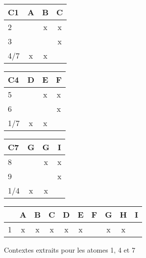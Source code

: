 \begin{figure}[H]
	\begin{minipage}[c]{0.3\textwidth}
	\begin{center}
		\begin{minipage}[c]{1\textwidth}
		\begin{center}
			\begin{tabular}{ l | c c c }
				C1 & A & B & C \\
				\hline
				2 & & x & x \\
				3 & & & x \\
				4/7 & x & x & \\
			\end{tabular}
		\end{center}
		\end{minipage}
		\begin{minipage}[c]{1\textwidth}
		\begin{center}
			\begin{tabular}{ l | c c c }
				C4 & D & E & F \\
				\hline
				5 & & x & x \\
				6 & & & x \\
				1/7 & x & x & \\
			\end{tabular}
		\end{center}
		\end{minipage}
		\begin{minipage}[c]{1\textwidth}
		\begin{center}
			\begin{tabular}{ l | c c c }
				C7 & G & G & I \\
				\hline
				8 & & x & x \\
				9 & & & x \\
				1/4 & x & x & \\
			\end{tabular}
		\end{center}
		\end{minipage}
	\end{center}
	\caption{Contextes extraits pour les atomes 1, 4 et 7}
	\label{contextes_extraits}
	\end{minipage}
	\begin{minipage}[c]{0.7\textwidth}
	\begin{center}
		\begin{tabular}{ l | c c c c c c c c c }
			& A & B & C & D & E & F & G & H & I \\
			\hline
			1 & x & x & x & x & x & & x & x & \\

\end{tabular}
\end{center}
\end{minipage}
\end{figure}
